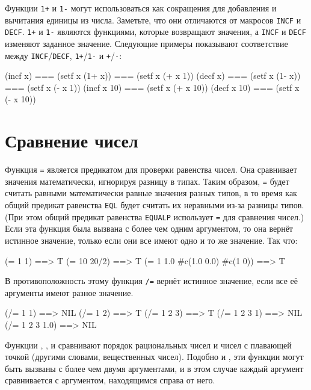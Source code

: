 Функции \lstinline{1+} и \lstinline{1-} могут использоваться как сокращения для добавления и
вычитания единицы из числа.  Заметьте, что они отличаются от макросов \lstinline{INCF} и
\lstinline{DECF}.  \lstinline{1+} и \lstinline{1-} являются функциями, которые возвращают значения, а
\lstinline{INCF} и \lstinline{DECF} изменяют заданное значение.  Следующие примеры показывают
соответствие между \lstinline{INCF}/\lstinline{DECF}, \lstinline{1+}/\lstinline{1-} и \lstinline{+}/\lstinline{-}:

\begin{myverb}
  (incf x)    === (setf x (1+ x)) === (setf x (+ x 1))
  (decf x)    === (setf x (1- x)) === (setf x (- x 1))
  (incf x 10) === (setf x (+ x 10))
  (decf x 10) === (setf x (- x 10))
\end{myverb}

\section{Сравнение чисел}

Функция \lstinline{=} является предикатом для проверки равенства чисел.  Она сравнивает
значения математически, игнорируя разницу в типах.  Таким образом, \lstinline{=} будет считать
равными математически равные значения разных типов, в то время как общий предикат
равенства \lstinline{EQL} будет считать их неравными из-за разницы типов. (При этом общий
предикат равенства \lstinline{EQUALP} использует \lstinline{=} для сравнения чисел.)  Если эта
функция была вызвана с более чем одним аргументом, то она вернёт истинное значение, только
если они все имеют одно и то же значение. Так что:

\begin{myverb}
  (= 1 1)                        ==> T
  (= 10 20/2)                    ==> T
  (= 1 1.0 #c(1.0 0.0) #c(1 0))  ==> T
\end{myverb}

В противоположность этому функция \lstinline{/=} вернёт истинное значение, если все её
аргументы имеют разное значение.

\begin{myverb}
  (/= 1 1)        ==> NIL
  (/= 1 2)        ==> T
  (/= 1 2 3)      ==> T
  (/= 1 2 3 1)    ==> NIL
  (/= 1 2 3 1.0)  ==> NIL
\end{myverb}

Функции \code{<}, \code{>}, \code{<=} и \code{>=} сравнивают порядок рациональных чисел и чисел с
плавающей точкой (другими словами, вещественных чисел).  Подобно \code{=} и \code{/=}, эти
функции могут быть вызваны с более чем двумя аргументами, и в этом случае каждый аргумент
сравнивается с аргументом, находящимся справа от него.


